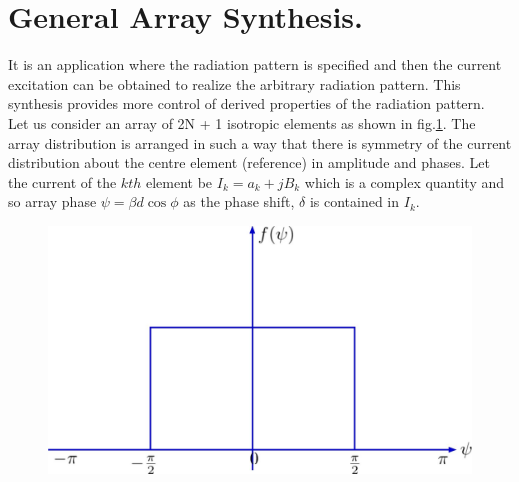 \section{General Array Synthesis.}
It is an application where the radiation pattern is specified and then the current excitation can be obtained to realize the arbitrary radiation pattern. This synthesis provides more control of derived properties of the radiation pattern.\\
Let us consider an array of 2N + 1 isotropic elements as shown in fig.\ref{fig:fig-4}. The array distribution is arranged in such a way that there is symmetry of the current distribution about the centre element (reference) in amplitude and phases. Let the current of the $kth$ element be $I_k =a_k + jB_k$ which is a complex quantity and so array phase $\psi =\beta d\cos\phi$ as the phase shift, $\delta$ is contained in $I_k$.
\begin{figure}[h]
\centering
\includegraphics[width=1\linewidth]{"./graphics/img59_5"}
\caption{}
\label{fig:fig-4}
\end{figure}

